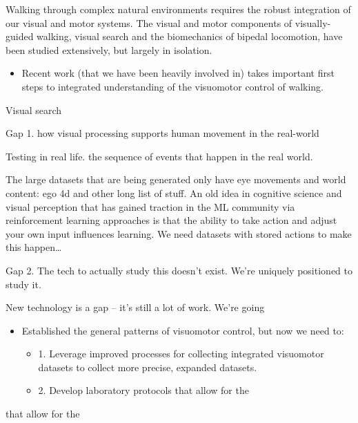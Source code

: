 Walking through complex natural environments requires the robust
integration of our visual and motor systems. The visual and motor
components of visually-guided walking, visual search and the
biomechanics of bipedal locomotion, have been studied extensively, but
largely in isolation.

\begin{itemize}
\item
  Recent work (that we have been heavily involved in) takes important
  first steps to integrated understanding of the visuomotor control of
  walking.
\end{itemize}

Visual search

Gap 1. how visual processing supports human movement in the real-world

Testing in real life. the sequence of events that happen in the real
world.

The large datasets that are being generated only have eye movements and
world content: ego 4d and other long list of stuff. An old idea in
cognitive science and visual perception that has gained traction in the
ML community via reinforcement learning approaches is that the ability
to take action and adjust your own input influences learning. We need
datasets with stored actions to make this happen\ldots{}

Gap 2. The tech to actually study this doesn't exist. We're uniquely
positioned to study it.

New technology is a gap -- it's still a lot of work. We're going

\begin{itemize}
\item
  Established the general patterns of visuomotor control, but now we
  need to:

  \begin{itemize}
  \item
    1. Leverage improved processes for collecting integrated visuomotor
    datasets to collect more precise, expanded datasets.
  \item
    2. Develop laboratory protocols that allow for the
  \end{itemize}
\end{itemize}
that allow for the